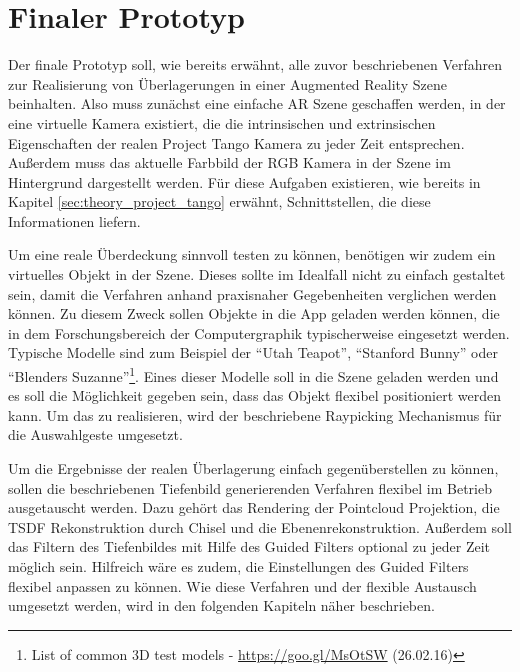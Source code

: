 \section{Finaler Prototyp} \label{sec:final_prototype}

Der finale Prototyp soll, wie bereits erwähnt, alle zuvor beschriebenen Verfahren zur Realisierung von Überlagerungen in einer Augmented Reality Szene beinhalten. Also muss zunächst eine einfache AR Szene geschaffen werden, in der eine virtuelle Kamera existiert, die die intrinsischen und extrinsischen Eigenschaften der realen Project Tango Kamera zu jeder Zeit entsprechen. Außerdem muss das aktuelle Farbbild der RGB Kamera in der Szene im Hintergrund dargestellt werden. Für diese Aufgaben existieren, wie bereits in Kapitel \ref{sec:theory_project_tango} erwähnt, Schnittstellen, die diese Informationen liefern. 

Um eine reale Überdeckung sinnvoll testen zu können, benötigen wir zudem ein virtuelles Objekt in der Szene. Dieses sollte im Idealfall nicht zu einfach gestaltet sein, damit die Verfahren anhand praxisnaher Gegebenheiten verglichen werden können. Zu diesem Zweck sollen Objekte in die App geladen werden können, die in dem Forschungsbereich der Computergraphik typischerweise eingesetzt werden. Typische Modelle sind zum Beispiel der \enquote{Utah Teapot}, \enquote{Stanford Bunny} oder \enquote{Blenders Suzanne}\footnote{List of common 3D test models - \url{https://goo.gl/MsOtSW} (26.02.16)}.  Eines dieser Modelle soll in die Szene geladen werden und es soll die Möglichkeit gegeben sein, dass das Objekt flexibel positioniert werden kann. Um das zu realisieren, wird der beschriebene Raypicking Mechanismus für die Auswahlgeste umgesetzt.

Um die Ergebnisse der realen Überlagerung einfach gegenüberstellen zu können, sollen die beschriebenen Tiefenbild generierenden Verfahren flexibel im Betrieb ausgetauscht werden. Dazu gehört das Rendering der Pointcloud Projektion, die TSDF Rekonstruktion durch Chisel und die Ebenenrekonstruktion. Außerdem soll das Filtern des Tiefenbildes mit Hilfe des Guided Filters optional zu jeder Zeit möglich sein. Hilfreich wäre es zudem, die Einstellungen des Guided Filters flexibel anpassen zu können. Wie diese Verfahren und der flexible Austausch umgesetzt werden, wird in den folgenden Kapiteln näher beschrieben.